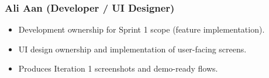 \documentclass[12pt, a4paper]{article}
\begin{document}
\subsubsection*{Ali Aan \normalfont\small\color{muted}(Developer / UI Designer)}
\begin{itemize}
  \item Development ownership for Sprint 1 scope (feature implementation).
  \item UI design ownership and implementation of user-facing screens.
  \item Produces Iteration 1 screenshots and demo-ready flows.
\end{itemize}

\end{document}
